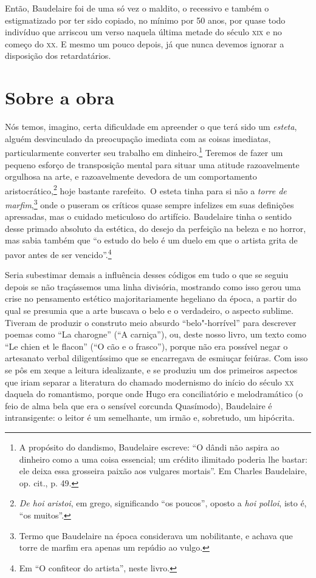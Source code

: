Então, Baudelaire foi de uma só vez o maldito, o recessivo e também o
estigmatizado por ter sido copiado, no mínimo por 50 anos, por quase
todo indivíduo que arriscou um verso naquela última metade do século
\textsc{xix} e no começo do \textsc{xx}. E mesmo um pouco depois, 
já que nunca devemos ignorar a disposição dos retardatários.

\section{Sobre a obra}

Nós temos, imagino, certa dificuldade em apreender o que terá sido um
\textit{esteta}, alguém desvinculado da preocupação imediata com as
coisas imediatas, particularmente converter seu trabalho em
dinheiro.\footnote{ A propósito do dandismo, Baudelaire escreve: “O
dândi não aspira ao dinheiro como a uma coisa essencial; um crédito
ilimitado poderia lhe bastar: ele deixa essa grosseira paixão aos
vulgares mortais”. Em Charles Baudelaire, op. cit., p. 49.} 
Teremos de fazer um pequeno esforço de
transposição mental para situar uma atitude razoavelmente orgulhosa na
arte, e razoavelmente devedora de um comportamento
aristocrático,\footnote{ 
\textit{De hoi aristoi}, em grego, significando “os
poucos”, oposto a \textit{hoi polloi}, isto é, “os muitos”.}
hoje bastante rarefeito.~O esteta tinha para si não a \textit{torre de marfim},\footnote{ Termo que Baudelaire
na época considerava um nobilitante, e achava que torre de marfim era apenas um repúdio ao vulgo.} 
onde o puseram os críticos quase sempre infelizes em suas definições
apressadas, mas o cuidado meticuloso do artifício. Baudelaire tinha o
sentido desse primado absoluto da estética, do desejo da perfeição na
beleza e no horror, mas sabia também que “o estudo do belo é um duelo
em que o artista grita de pavor antes de ser vencido”.\footnote{ Em “O
confiteor do artista”, neste livro.}

Seria subestimar demais a influência desses códigos em tudo o que se
seguiu depois se não traçássemos uma linha divisória, mostrando como
isso gerou uma crise no pensamento estético majoritariamente hegeliano
da época, a partir do qual se presumia que a arte buscava o belo e o
verdadeiro, o aspecto sublime. Tiveram de produzir o construto meio
absurdo “belo"-horrível” para descrever poemas como “La charogne” (“A
carniça”), ou, deste nosso livro, um texto como “Le chien et le flacon”
(“O cão e o frasco”), porque não era possível negar o artesanato verbal
diligentíssimo que se encarregava de esmiuçar feiúras. Com isso se pôs
em xeque a leitura idealizante, e se produziu um dos primeiros aspectos
que iriam separar a literatura do chamado modernismo do início do
século \textsc{xx} daquela do romantismo, porque onde Hugo era conciliatório e
melodramático (o feio de alma bela que era o sensível corcunda
Quasímodo), Baudelaire é intransigente: o leitor é um semelhante, um
irmão e, sobretudo, um hipócrita.

